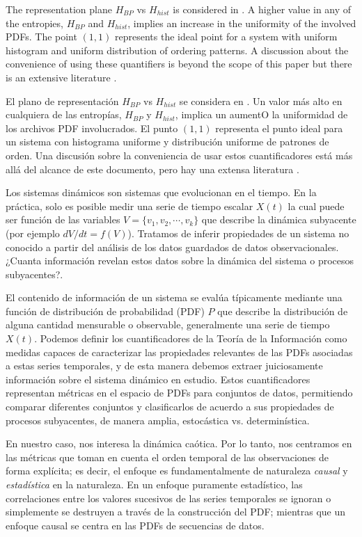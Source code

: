 The representation plane $H_{BP}$ vs $H_{hist}$ is considered in \cite{DeMicco2008}.
A higher value in any of the entropies, $H_{BP}$ and $H_{hist}$, implies an
increase in the uniformity of the involved PDFs. The point
$(1,1)$ represents the ideal point for a system with uniform histogram and
uniform distribution of ordering patterns.
A discussion about the convenience of using these quantifiers is beyond the scope of this paper but there is an extensive literature  \cite{DeMicco2008,Rosso2007C,Martin2006}.

El plano de representación $H_{BP}$ vs $H_{hist}$ se considera en \cite{DeMicco2008}.
Un valor más alto en cualquiera de las entropías, $H_{BP}$ y $H_{hist}$, implica un aumentO la uniformidad de los archivos PDF involucrados.
El punto $(1,1)$ representa el punto ideal para un sistema con histograma uniforme y distribución uniforme de patrones de orden.
Una discusión sobre la conveniencia de usar estos cuantificadores está más allá del alcance de este documento, pero hay una extensa literatura \cite{DeMicco2008, Rosso2007C, Martin2006}.

Los sistemas dinámicos son sistemas que evolucionan en el tiempo.
En la práctica, solo es posible medir una serie de tiempo escalar $X(t)$ la cual puede ser función de las variables $V=\{ v_1, v_2,\cdots, v_k\}$ que describe la dinámica subyacente (por ejemplo $dV/dt=f(V)$).
Tratamos de inferir propiedades de un sistema no conocido a partir del análisis de los datos guardados de datos observacionales.
¿Cuanta información revelan estos datos sobre la dinámica del sistema o procesos subyacentes?.

El contenido de información de un sistema se evalúa típicamente mediante una función de distribución de probabilidad (PDF) $P$ que describe la distribución de alguna cantidad mensurable o observable, generalmente una serie de tiempo $X(t)$.
Podemos definir los cuantificadores de la Teoría de la Información como medidas capaces de caracterizar las propiedades relevantes de las PDFs asociadas a estas series temporales, y de esta manera debemos extraer juiciosamente información sobre el sistema dinámico en estudio.
Estos cuantificadores representan métricas en el espacio de PDFs para conjuntos de datos, permitiendo comparar diferentes conjuntos y clasificarlos de acuerdo a sus propiedades de procesos subyacentes, de manera amplia, estocástica vs. determinística.

En nuestro caso, nos interesa la dinámica caótica.
Por lo tanto, nos centramos en las métricas que toman en cuenta el orden temporal de las observaciones de forma explícita; es decir, el enfoque es fundamentalmente de naturaleza \textit{causal} y \textit{estadística} en la naturaleza.
En un enfoque puramente estadístico, las correlaciones entre los valores sucesivos de las series temporales se ignoran o simplemente se destruyen a través de la construcción del PDF; mientras que un enfoque causal se centra en las PDFs de secuencias de datos.

